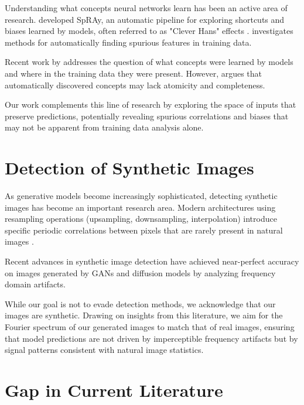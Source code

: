 \documentclass[licencjacka,en]{pracamgr}
\begin{document}
Understanding what concepts neural networks learn has been an active area of research. \cite{Lapuschkin_2019} developed SpRAy, an automatic pipeline for exploring shortcuts and biases learned by models, often referred to as "Clever Hans" effects \cite{pfungst1911cleverHans}. \cite{neuhaus2023spuriousfeatureslargescale} investigates methods for automatically finding spurious features in training data.

Recent work by \cite{dreyer2025mechanisticunderstandingvalidationlarge} addresses the question of what concepts were learned by models and where in the training data they were present. However, \cite{leask2025sparse} argues that automatically discovered concepts may lack atomicity and completeness.

Our work complements this line of research by exploring the space of inputs that preserve predictions, potentially revealing spurious correlations and biases that may not be apparent from training data analysis alone.

\section{Detection of Synthetic Images}

As generative models become increasingly sophisticated, detecting synthetic images has become an important research area. Modern architectures using resampling operations (upsampling, downsampling, interpolation) introduce specific periodic correlations between pixels that are rarely present in natural images \cite{Popescu2005ExposingDF}.

Recent advances in synthetic image detection \cite{zhang2019detectingsimulatingartifactsgan, wang2023dirediffusiongeneratedimagedetection, zhang2023diffusion} have achieved near-perfect accuracy on images generated by GANs and diffusion models by analyzing frequency domain artifacts.

While our goal is not to evade detection methods, we acknowledge that our images are synthetic. Drawing on insights from this literature, we aim for the Fourier spectrum of our generated images to match that of real images, ensuring that model predictions are not driven by imperceptible frequency artifacts but by signal patterns consistent with natural image statistics.

\section{Gap in Current Literature}
\end{document}
